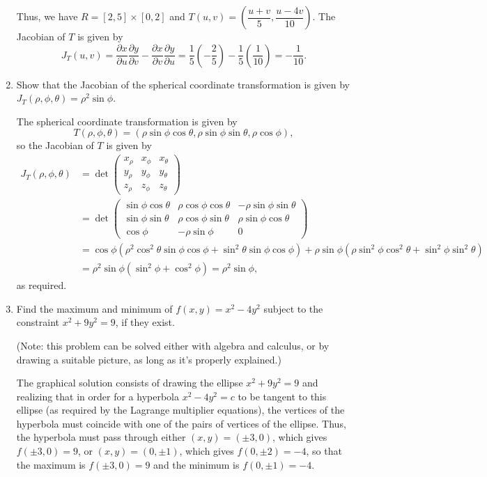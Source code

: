 \documentclass[12pt]{article}
\newcommand{\points}[1]{\marginpar{\hspace{24pt}[#1]}}
\begin{document}
\begin{enumerate}
Thus, we have $R=[2,5]\times [0,2]$ and $T(u,v) = \left(\dfrac{u+v}{5},\dfrac{u-4v}{10}\right)$. The Jacobian of $T$ is given by
\[
 J_T(u,v) = \frac{\partial x}{\partial u}\frac{\partial y}{\partial v}-\frac{\partial x}{\partial v}\frac{\partial y}{\partial u} = \frac{1}{5}\left(-\frac{2}{5}\right)-\frac{1}{5}\left(\frac{1}{10}\right) = -\frac{1}{10}.
\]


\item Show that the Jacobian of the spherical coordinate transformation is given by $J_T(\rho,\phi,\theta) = \rho^2\sin\phi$.\points{4}


\bigskip

The spherical coordinate transformation is given by 
\[   
T(\rho,\phi,\theta) = (\rho\sin\phi\cos\theta,\rho\sin\phi\sin\theta,\rho\cos\phi),
\]
so the Jacobian of $T$ is given by
\begin{align*}
 J_T(\rho,\phi,\theta) &= \det\begin{pmatrix}
                              x_\rho&x_\phi& x_\theta\\y_\rho&y_\phi&y_\theta\\z_\rho&z_\phi&z_\theta
                             \end{pmatrix}\\
& = \det\begin{pmatrix}
         \sin\phi\cos\theta& \rho\cos\phi\cos\theta& -\rho\sin\phi\sin\theta\\ \sin\phi\sin\theta& \rho\cos\phi\sin\theta& \rho\sin\phi\cos\theta\\ \cos\phi & -\rho\sin\phi & 0
        \end{pmatrix}\\
& = \cos\phi(\rho^2\cos^2\theta\sin\phi\cos\phi+\sin^2\theta\sin\phi\cos\phi)+\rho
\sin\phi(\rho\sin^2\phi\cos^2\theta+\sin^2\phi\sin^2\theta)\\
& = \rho^2\sin\phi(\sin^2\phi+\cos^2\phi) = \rho^2\sin\phi,
\end{align*}
as required.

\newpage

\item Find the maximum and minimum of $f(x,y)=x^2-4y^2$ subject to the constraint $x^2+9y^2=9$, if they exist. \points{7}

(Note: this problem can be solved either with algebra and calculus, or by drawing a suitable picture, as long as it's properly explained.)

\bigskip

The graphical solution consists of drawing the ellipse $x^2+9y^2=9$ and realizing that in order for a hyperbola $x^2-4y^2=c$ to be tangent to this ellipse (as required by the Lagrange multiplier equations), the vertices of the hyperbola must coincide with one of the pairs of vertices of the ellipse. Thus, the hyperbola must pass through either $(x,y) = (\pm 3, 0)$, which gives $f(\pm 3, 0) = 9$, or $(x,y) = (0,\pm 1)$, which gives $f(0,\pm 2) = -4$, so that the maximum is $f(\pm 3,0)=9$ and the minimum is $f(0, \pm 1) = -4$.


\end{enumerate}
\end{document}

